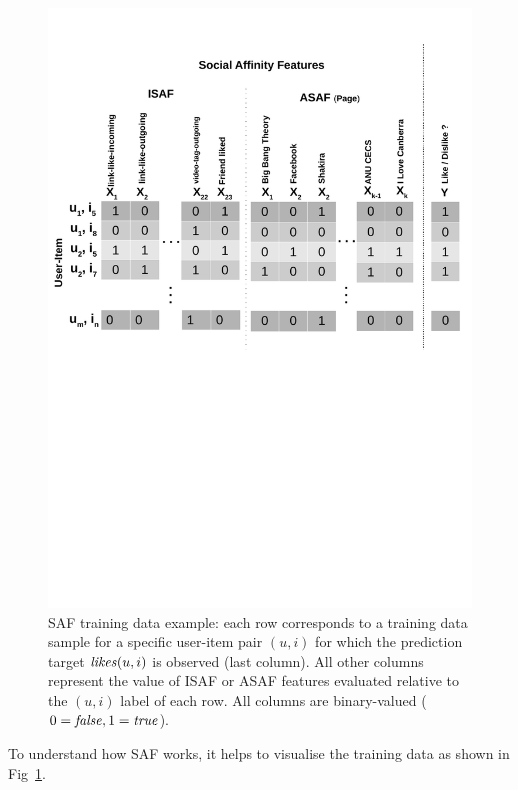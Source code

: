 \begin{figure}[t!]
\centering
\includegraphics[width=1\linewidth]{data/plots/features/saf_features}
\caption{SAF training data example: each row corresponds to a training
  data sample for a specific user-item pair $(u,i)$ for which the
  prediction target $\like(u,i)$ is observed (last column).  All other
  columns represent the value of ISAF or ASAF features
  evaluated relative to the $(u,i)$ label of each row.
  All columns are binary-valued ($0=\false,1=\true$).}
\label{fig:features_overview}
\end{figure}

To understand how SAF works, it helps to visualise the training data as shown
in Fig~\ref{fig:features_overview}.  

